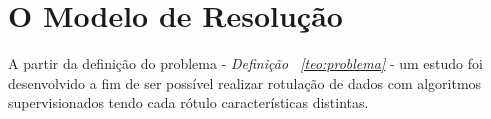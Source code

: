 


\section{O Modelo de Resolução}\label{cap:ferramentas:sec:modeloresolucao}

A partir da definição do problema - \textit{Definição ~\ref{teo:problema}} - um estudo  foi desenvolvido a fim de ser possível realizar rotulação de dados com  algoritmos supervisionados tendo cada rótulo características distintas.


